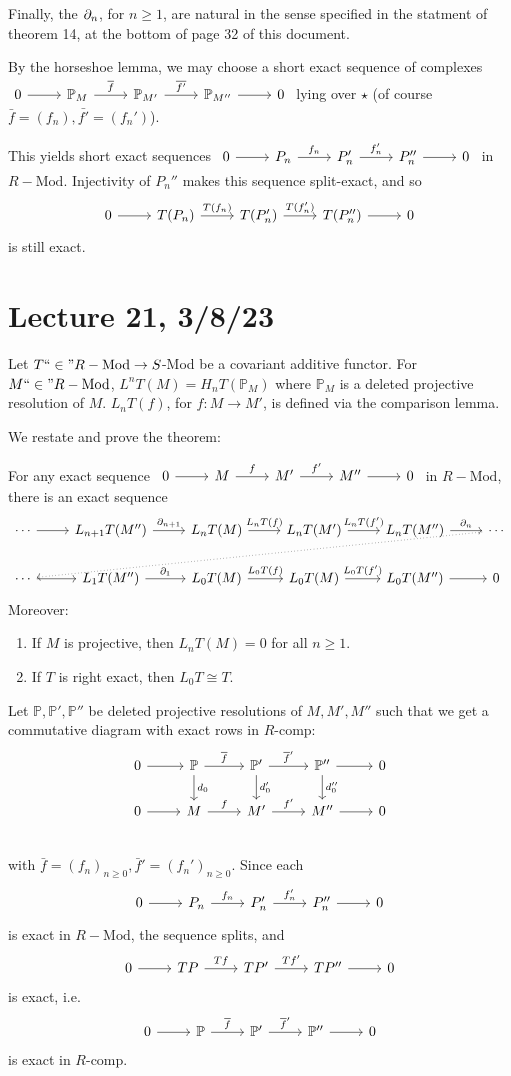 \documentclass[x11names,reqno,14pt]{extarticle}
\newcommand{\fin}{``\in"}
\newcommand{\RMod}{R-\text{Mod}}
\newcommand{\barf}{\bar{f}}
\renewcommand{\P}{\mathbb{P}}
\begin{document}
Finally, the $\partial_n$, for $n\geq1$, are natural in the sense specified in the statment of theorem 14, at the bottom of page 32 of this document.

\proof

By the horseshoe lemma, we may choose a short exact sequence of complexes $\exactshort{\P_M}{\barf}{\P_{M'}}{\bar{f'}}{\P_{M''}}$ lying over $\star$ (of course $\barf = (f_n), \bar{f'} = (f_n')$).

This yields short exact sequences $\exactshort{P_n}{f_n}{P_n'}{f_n'}{P_n''}$ in $\RMod$. Injectivity of $P_n''$ makes this sequence split-exact, and so 
\[
\exactshort{T(P_n)}{T(f_n)}{T(P_n')}{T(f_n')}{T(P_n'')}
\]
is still exact. 

\section*{Lecture 21, 3/8/23}

Let $T \fin \RMod\to S$-Mod be a covariant additive functor. For $M\fin\RMod$, $L^nT(M) = H_nT(\P_M)$ where $\P_M$ is a deleted projective resolution of $M$. $L_nT(f)$, for $f:M\to M'$, is defined via the comparison lemma. 

We restate and prove the theorem:

\thm 

For any exact sequence $\exactshort{M}{f}{M'}{f'}{M''}$ in $\RMod$, there is an exact sequence 
\[
\begin{tikzcd}
\cdots \ar[r]&L_{n + 1}T(M'') \ar[r, "\del_{n + 1}"] & L_nT(M)\ar[r, "L_nT(f)"] & L_nT(M') \ar[r, "L_nT(f')"] & L_nT(M'') \ar[r, "\del_n"] & \cdots \ar[dlllll, dotted]\\
\cdots \ar[r] & L_1T(M'')\ar[r, "\del_1"] & L_0T(M) \ar[r, "L_0T(f)"] & L_0T(M) \ar[r, "L_0T(f')"] & L_0T(M'') \ar[r] & 0 
\end{tikzcd}
\]
Moreover:
\begin{enumerate}[label=(\alph*)]

\item If $M$ is projective, then $L_nT(M) = 0$ for all $n \geq 1$. 

\item If $T$ is right exact, then $L_0T \cong T$. 

\end{enumerate}

\proof

Let $\P,\P',\P''$ be deleted projective resolutions of $M, M', M''$ such that we get a commutative diagram with exact rows in $R$-comp:
\[
\begin{tikzcd}
0\ar[r] & \P \ar[d, "d_0"] \ar[r, "\barf"] & \P'\ar[d, "d_0'"] \ar[r, "\barf'"] & \P'' \ar[r]\ar[d, "d_0''"] & 0 \\
0 \ar[r] & M \ar[r, "f"] & M' \ar[r, "f'"] & M'' \ar[r] & 0 \\
\end{tikzcd}
\]
with $\barf = (f_n)_{n\geq0}, \barf'= (f_n')_{n\geq0}.$ Since each 
\[
\exactshort{P_n}{f_n}{P_n'}{f_n'}{P_n''}
\]
is exact in $\RMod$, the sequence splits, and
\[
\exactshort{TP}{Tf}{TP'}{Tf'}{TP''}
\]
is exact, i.e.
\[
\exactshort{\P}{\barf}{\P'}{\barf'}{\P''}
\]
is exact in $R$-comp. 
\end{document}
